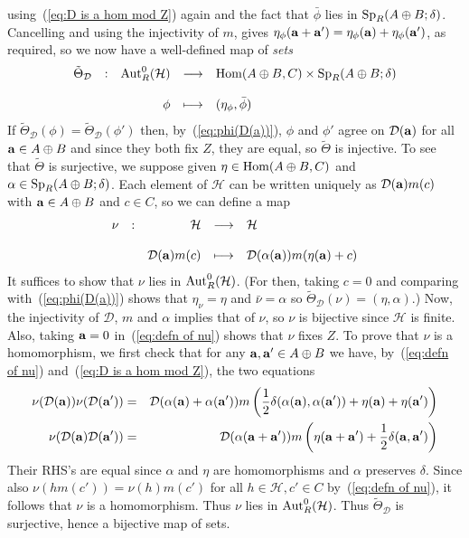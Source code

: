 \documentclass[12pt]{article}
\newcommand{\Aut}{{\rm Aut}}
\newcommand{\ba}{\ensuremath{{\bf a}}}
\newcommand{\cD}{\ensuremath{\mathcal{D}}}
\newcommand{\cH}{\ensuremath{\mathcal{H}}}
\newcommand{\displaymapdef}[5]
{
	\begin{array}{rcrcl}
		#1 &:& #2 &\longrightarrow& #3 \\
		& &    &                    \\
		& & #4 &\longmapsto    & #5
	\end{array}
}
\newcommand{\half}{\frac{1}{2}}
\newcommand{\Hom}{{\rm Hom}}
\renewcommand{\t}[1]{\tilde{#1}}
\newcommand{\AdsB}{\ensuremath{A\oplus B}}
\newcommand{\SpABd}[1]{\ensuremath{{\rm Sp}_{#1}(\AdsB;\delta)}}
\begin{document}
using~(\ref{eq:D is a hom mod Z}) again and the fact that  $\bar{\phi}$ lies in $\SpABd{R}$. Cancelling and using the injectivity of $m$, gives 
$\eta_\phi(\ba+\ba')=\eta_\phi(\ba)+\eta_\phi(\ba')$, as required, so we now have a well-defined map of \textit{sets}
$$
\displaymapdef{\t \Theta_\cD}{\Aut^0_R(\cH)}{\Hom(\AdsB,C)\times\SpABd{R}}{\phi}{(\eta_\phi,\bar{\phi})}
$$
If ${\t \Theta_\cD}(\phi)={\t \Theta_\cD}(\phi')$ then, by~(\ref{eq:phi(D(a))}), $\phi$ and $\phi'$ agree on $\cD(\ba)$ for all $\ba\in\AdsB$ and since they both fix $Z$, they are equal, so ${\t \Theta}$ is injective. To see that ${\t \Theta}$ is surjective, we suppose given  $\eta\in\Hom(\AdsB,C)$ and $\alpha\in\SpABd{R}$. Each element of $\cH$ can be written uniquely as $\cD(\ba)m(c)$ with $\ba\in\AdsB$ and $c\in C$, so we can define a map 
\begin{equation}\label{eq:defn of nu}
\displaymapdef{\nu}{\cH}{\cH}{\cD(\ba)m(c)}{\cD(\alpha(\ba))m(\eta(\ba)+c)}	
\end{equation}
It suffices to show that $\nu$ lies in $\Aut^0_R(\cH)$. (For then, taking $c=0$ and comparing with~(\ref{eq:phi(D(a))})
shows that $\eta_\nu=\eta$ and $\bar{\nu}=\alpha$ so  ${\t \Theta_\cD}(\nu)=(\eta,\alpha)$.) 
Now, the injectivity of $\cD$, $m$ and $\alpha$ implies that of $\nu$, so $\nu$ is bijective since $\cH$ is 
finite. Also, taking $\ba=0$ in~(\ref{eq:defn of nu}) shows that $\nu$ fixes $Z$. To prove that $\nu$ is a homomorphism, we first check that for any $\ba,\ba'\in\AdsB$ we have, by~(\ref{eq:defn of nu}) and~(\ref{eq:D is a hom mod Z}), the two equations 
\begin{eqnarray*}
\nu(\cD(\ba))\nu(\cD(\ba'))&=&\cD(\alpha(\ba)+\alpha(\ba'))m\left(\frac12\delta(\alpha(\ba),\alpha(\ba'))+\eta(\ba)+\eta(\ba')\right)\\
\nu(\cD(\ba)\cD(\ba'))&=&\cD(\alpha(\ba+\ba'))m\left(\eta(\ba+\ba')+\half\delta(\ba,\ba')\right)
\end{eqnarray*}
Their RHS's are equal since $\alpha$ and $\eta$ are homomorphisms and $\alpha$ preserves $\delta$. Since also $\nu(hm(c'))=\nu(h)m(c')$ for all $h\in\cH,c'\in C$ by~(\ref{eq:defn of nu}), it follows that $\nu$ is a homomorphism. Thus $\nu$ lies in $\Aut^0_R(\cH)$. Thus ${\t \Theta_\cD}$ is surjective, hence a bijective map of sets. 
\end{document}
